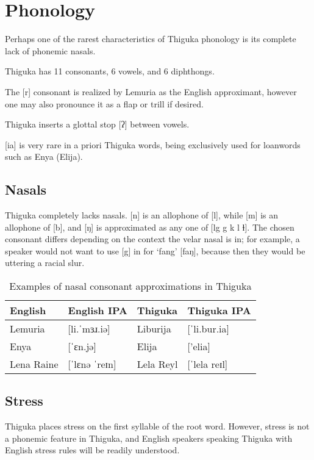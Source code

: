 \newpage

\section{Phonology}

Perhaps one of the rarest characteristics of Thiguka phonology is its complete lack of phonemic nasals.

Thiguka has 11 consonants, 6 vowels, and 6 diphthongs.



The [r] consonant is realized by Lemuria as the English approximant, however one may also pronounce it as a flap or trill if desired.

Thiguka inserts a glottal stop [ʔ] between vowels.

[ia] is very rare in a priori Thiguka words, being exclusively used for loanwords such as Enya (Elija).

\subsection{Nasals}

Thiguka completely lacks nasals. [n] is an allophone of [l], while [m] is an allophone of [b], and [ŋ] is approximated as any one of [lg g k l ɫ].
The chosen consonant differs depending on the context the velar nasal is in; for example, a speaker would not want to use [g] in for `fang' [faŋ], because then they would be uttering a racial slur.

\begin{table}[h!]
    \centering
    \caption{Examples of nasal consonant approximations in Thiguka}
    \begin{tabularx}{15cm}{|X|X|X|X|}
        \hline
        \textbf{English} & \textbf{English IPA} & \textbf{Thiguka} & \textbf{Thiguka IPA} \\
        \hline
        Lemuria    & [li.ˈmɜɹ.iə]   & Liburija  & [ˈli.bur.ia] \\
        Enya       & [ˈɛn.jə]       & Elija     & ['elia] \\
        Lena Raine & [ˈlɛnə ˈreɪn]  & Lela Reyl & [ˈlela reɪl] \\
        \hline
    \end{tabularx}
\end{table}

\subsection{Stress}
Thiguka places stress on the first syllable of the root word.
However, stress is not a phonemic feature in Thiguka, and English speakers speaking Thiguka with English stress rules will be readily understood.


